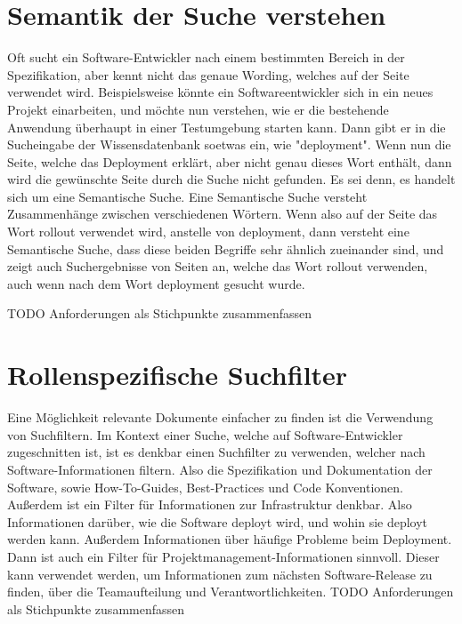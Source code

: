 \section{Semantik der Suche verstehen}
Oft sucht ein Software-Entwickler nach einem bestimmten Bereich in der Spezifikation, aber kennt nicht das genaue Wording, welches auf der Seite verwendet wird.
Beispielsweise könnte ein Softwareentwickler sich in ein neues Projekt einarbeiten, und möchte nun verstehen, wie er die bestehende Anwendung überhaupt in einer Testumgebung starten kann.
Dann gibt er in die Sucheingabe der Wissensdatenbank soetwas ein, wie "deployment".
Wenn nun die Seite, welche das Deployment erklärt, aber nicht genau dieses Wort enthält, dann wird die gewünschte Seite durch die Suche nicht gefunden.
Es sei denn, es handelt sich um eine Semantische Suche.
Eine Semantische Suche versteht Zusammenhänge zwischen verschiedenen Wörtern.
Wenn also auf der Seite das Wort rollout verwendet wird, anstelle von deployment, dann versteht eine Semantische Suche, dass diese beiden Begriffe sehr ähnlich zueinander sind, und zeigt auch Suchergebnisse von Seiten an, welche das Wort rollout verwenden, auch wenn nach dem Wort deployment gesucht wurde.

TODO Anforderungen als Stichpunkte zusammenfassen

\section{Rollenspezifische Suchfilter}
Eine Möglichkeit relevante Dokumente einfacher zu finden ist die Verwendung von Suchfiltern.
Im Kontext einer Suche, welche auf Software-Entwickler zugeschnitten ist, ist es denkbar einen Suchfilter zu verwenden, welcher nach Software-Informationen filtern.
Also die Spezifikation und Dokumentation der Software, sowie How-To-Guides, Best-Practices und Code Konventionen.
Außerdem ist ein Filter für Informationen zur Infrastruktur denkbar. Also Informationen darüber, wie die Software deployt wird, und wohin sie deployt werden kann.
Außerdem Informationen über häufige Probleme beim Deployment.
Dann ist auch ein Filter für Projektmanagement-Informationen sinnvoll.
Dieser kann verwendet werden, um Informationen zum nächsten Software-Release zu finden, über die Teamaufteilung und Verantwortlichkeiten.
TODO Anforderungen als Stichpunkte zusammenfassen


